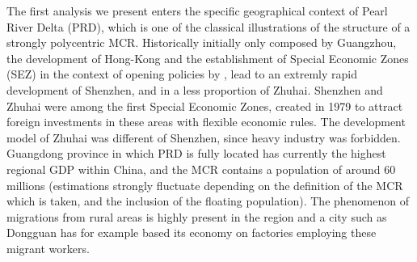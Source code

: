 The first analysis we present enters the specific geographical context of Pearl River Delta (PRD), which is one of the classical illustrations of the structure of a strongly polycentric MCR. Historically initially only composed by Guangzhou, the development of Hong-Kong and the establishment of Special Economic Zones (SEZ) in the context of opening policies by , lead to an extremly rapid development of Shenzhen, and in a less proportion of Zhuhai. Shenzhen and Zhuhai were among the first Special Economic Zones, created in 1979 to attract foreign investments in these areas with flexible economic rules. The development model of Zhuhai was different of Shenzhen, since heavy industry was forbidden. Guangdong province in which PRD is fully located has currently the highest regional GDP within China, and the MCR contains a population of around 60 millions (estimations strongly fluctuate depending on the definition of the MCR which is taken, and the inclusion of the floating population). The phenomenon of migrations from rural areas is highly present in the region and a city such as Dongguan has for example based its economy on factories employing these migrant workers.


